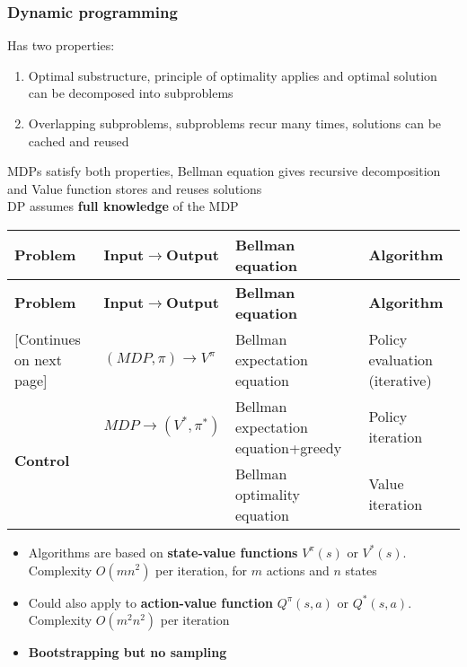 \subsubsection{Dynamic programming}
    Has two properties:
    \begin{enumerate}
        \item Optimal substructure, principle of optimality applies and optimal solution can be decomposed into subproblems
        \item Overlapping subproblems, subproblems recur many times, solutions can be cached and reused
    \end{enumerate}
    MDPs satisfy both properties, Bellman equation gives recursive decomposition and Value function stores and reuses solutions\\
    DP assumes \textbf{full knowledge} of the MDP
    \begin{tabularx}{\linewidth}{X X X X}
        \toprule
        \textbf{Problem} & \textbf{Input$\rightarrow$Output} & \textbf{Bellman equation} & \textbf{Algorithm}\\
        \midrule
        \endfirsthead
        \toprule
        \textbf{Problem} & \textbf{Input$\rightarrow$Output} & \textbf{Bellman equation} & \textbf{Algorithm}\\
        \midrule
        \endhead
        \midrule
        \footnotesize [Continues on next page]
        \endfoot
        \bottomrule
        \endlastfoot
        \multirow{1}{*}{\textbf{Prediction}} & $\left(MDP,\pi\right)\rightarrow V^\pi$ & Bellman expectation equation & Policy evaluation (iterative) \\ \midrule
        \multirow{2}{*}{\textbf{Control}}   & $MDP\rightarrow\left(V^*,\pi^*\right)$ & Bellman expectation equation+greedy & Policy iteration \\ \cmidrule{3-4}
                                            & & Bellman optimality equation & Value iteration
    \end{tabularx}
    \begin{itemize}
        \item Algorithms are based on \textbf{state-value functions} $V^\pi(s)$ or $V^*(s)$. Complexity $O(mn^2)$ per iteration, for $m$ actions and $n$ states
        \item Could also apply to \textbf{action-value function} $Q^\pi(s,a)$ or $Q^*(s,a)$. Complexity $O(m^2n^2)$ per iteration 
        \item \textbf{Bootstrapping but no sampling}
    \end{itemize}
